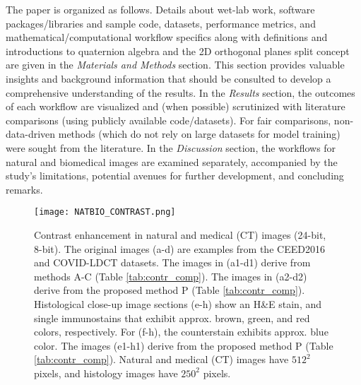 \documentclass[superscriptaddress,longbibliography,aps,prl,twocolumn,10pt]{revtex4-2}
\begin{document}
The paper is organized as follows. Details about wet-lab work, software packages/libraries and sample code, datasets, performance metrics, and mathematical/computational workflow specifics along with definitions and introductions to quaternion algebra and the 2D orthogonal planes split concept are given in the \textit{Materials and Methods} section. This section provides valuable insights and background information that should be consulted to develop a comprehensive understanding of the results. In the \textit{Results} section, the outcomes of each workflow are visualized and (when possible) scrutinized with literature comparisons (using publicly available code/datasets). For fair comparisons, non-data-driven methods (which do not rely on large datasets for model training) were sought from the literature. In the \textit{Discussion} section, the workflows for natural and biomedical images are examined separately, accompanied by the study’s limitations, potential avenues for further development, and concluding remarks.

\begin{figure}[t]
\centering
\texttt{[image: NATBIO\_CONTRAST.png]}
\vspace{-12pt}
\caption{\footnotesize{Contrast enhancement in natural and medical (CT) images (24-bit, 8-bit). The original images (a-d) are examples from the CEED2016 \cite{Qureshi2016, Qureshi2017} and COVID-LDCT \cite{Afshar2021} datasets. The images in (a1-d1) derive from methods A-C \cite{Beghdadi1989, Zuiderveld1994, Mukherjee2008} (Table \ref{tab:contr_comp}). The images in (a2-d2) derive from the proposed method P (Table \ref{tab:contr_comp}). Histological close-up image sections (e-h) show an H\&E stain, and single immunostains that exhibit approx. brown, green, and red colors, respectively. For (f-h), the counterstain exhibits approx. blue color. The images (e1-h1) derive from the proposed method P (Table \ref{tab:contr_comp}). Natural and medical (CT) images have $512^2$ pixels, and histology images have $250^2$ pixels.}}
\label{fig:img_contr}
\end{figure}
\end{document}
